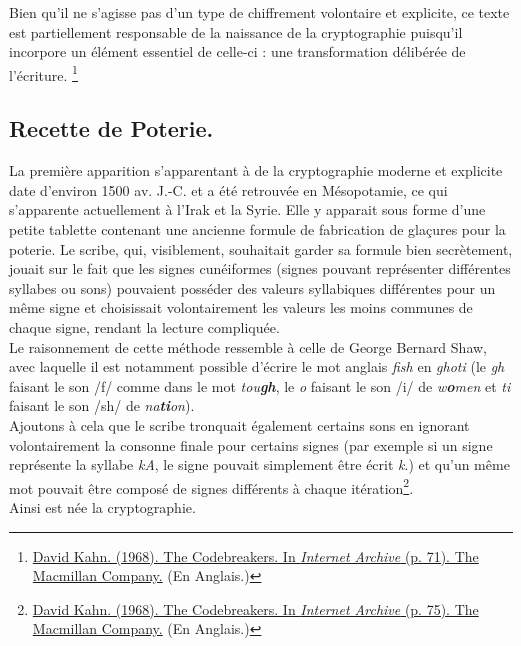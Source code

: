 \documentclass{article}
\begin{document}
Bien qu'il ne s'agisse pas d'un type de chiffrement volontaire et explicite, ce texte est partiellement responsable de la naissance de la cryptographie puisqu'il incorpore un élément essentiel de celle-ci : une transformation délibérée de l'écriture. \footnote{\href{https://archive.org/details/B-001-001-264/page/n47/mode/1up?view=theater}{David Kahn. (1968). The Codebreakers. In \textit{Internet Archive} (p. 71). The Macmillan Company.} (En Anglais.)}

\subsection{Recette de Poterie.}\label{poterie.}

La première apparition s'apparentant à de la cryptographie moderne et explicite date d'environ 1500 av. J.-C. et a été retrouvée en
Mésopotamie, ce qui s'apparente actuellement à l'Irak et la Syrie. Elle y apparait sous forme d'une petite tablette contenant une ancienne
formule de fabrication de glaçures pour la poterie. Le scribe, qui, visiblement, souhaitait garder sa formule bien secrètement, jouait sur le fait que les signes cunéiformes (signes pouvant représenter différentes syllabes ou sons) pouvaient posséder des valeurs syllabiques
différentes pour un même signe et choisissait volontairement les valeurs les moins communes de chaque signe, rendant la lecture compliquée. \\

Le raisonnement de cette méthode ressemble à celle de George Bernard Shaw, avec laquelle il est notamment possible d'écrire le mot anglais \textit{fish} en \textit{ghoti} (le \textit{gh} faisant le son /f/ comme dans
le mot \textit{tou\textbf{gh}}, le \textit{o} faisant le son /i/ de \textit{w\textbf{o}men} et \textit{ti} faisant le son /sh/ de \textit{na\textbf{ti}on}). \\

Ajoutons à cela que le scribe tronquait également certains sons en ignorant volontairement la consonne finale pour certains signes (par exemple si un signe représente la syllabe \textit{kA}, le signe pouvait simplement être écrit \textit{k}.) et qu'un même mot pouvait être composé de signes différents à chaque itération\footnote{\href{https://archive.org/details/B-001-001-264/page/n47/mode/1up?view=theater}{David Kahn. (1968). The Codebreakers. In \textit{Internet Archive} (p. 75). The Macmillan Company.} (En Anglais.)}.\\
	
Ainsi est née la cryptographie.  
\end{document}
